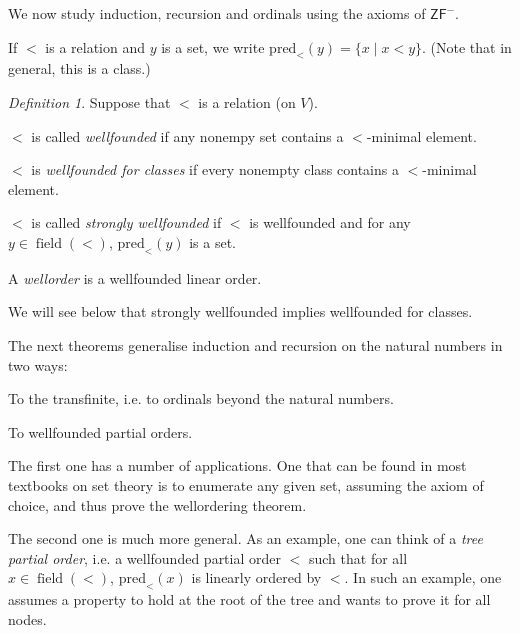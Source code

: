 \documentclass[a4paper, 11pt]{amsart}
\theoremstyle{remark}
\newtheorem{definition}[definition]{Definition}
\newcommand{\axiomft}[1]{\mathsf{#1}}
\newcommand{\ZF}{\axiomft{ZF}}
\newcommand{\pred}{\mathrm{pred}}
\DeclareMathOperator{\field}{field}
\newenvironment{enumerate-(1)}{\begin{enumerate}[label={\upshape (\arabic*)}, leftmargin=2pc]}{\end{enumerate}}
\begin{document}
We now study induction, recursion and ordinals using the axioms of $\ZF^-$. 

If $<$ is a relation and $y$ is a set, we write $\pred_{<}(y)=\{x\mid x<y\}$. (Note that in general, this is a class.) 

\begin{definition} 
Suppose that $<$ is a relation (on $V$). 
\begin{enumerate-(1)}
\item 
$<$ is called \emph{wellfounded} if any nonempy set contains a $<$-minimal element. 
\item 
$<$ is \emph{wellfounded for classes} if every nonempty class contains a $<$-minimal element. 
\item 
$<$ is called \emph{strongly wellfounded} if $<$ is wellfounded and for any $y\in \field(<)$, $\pred_{<}(y)$ is a set. 
\item 
A \emph{wellorder} is a wellfounded linear order. 
\end{enumerate-(1)}
\end{definition} 

We will see below that strongly wellfounded implies wellfounded for classes. 


The next theorems generalise induction and recursion on the natural numbers in two ways: 
\begin{enumerate-(1)} 
\item 
To the transfinite, i.e. to ordinals beyond the natural numbers. 
\item 
To wellfounded partial orders. 
\end{enumerate-(1)} 

The first one has a number of applications. 
One that can be found in most textbooks on set theory is to enumerate any given set, assuming the axiom of choice, and thus prove the wellordering theorem. 

The second one is much more general. As an example, one can think of a \emph{tree partial order}, i.e. a wellfounded partial order $<$ such that for all $x\in \field(<)$, $\pred_<(x)$ is linearly ordered by $<$. 
In such an example, one assumes a property to hold at the root of the tree and wants to prove it for all nodes. 
\end{document}
